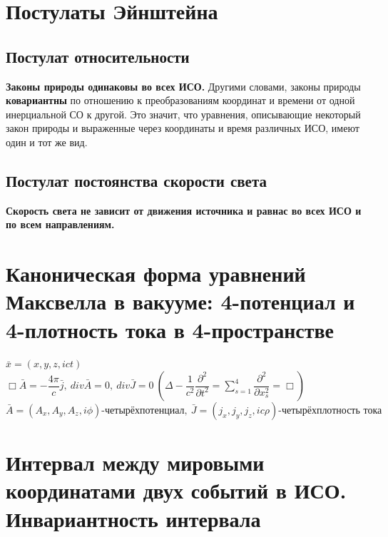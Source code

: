 \newcommand{\colontitulAutors}{edombek, astronom\_v\_cube}
\newcommand{\colontitulYear}{2022}
\newcommand{\colontitulEducationalSubject}{Специальная теория относительности}
\newcommand{\colontitulTeacher}{И.~А.~Павличенко}




	\small
	\begin{multicols*}{2}
		\section{Постулаты Эйнштейна}
		
		\subsection{Постулат относительности}
		
		\textbf{Законы природы одинаковы во всех ИСО.} Другими словами, законы природы \textbf{ковариантны} по отношению к преобразованиям координат и времени от одной инерциальной СО к другой. Это значит, что уравнения, описывающие некоторый закон природы и выраженные через координаты и время различных ИСО, имеют один и тот же вид.
		
		\subsection{Постулат постоянства скорости света}
		
		\textbf{Скорость света не зависит от движения источника и равнас во всех ИСО и по всем направлениям.}
		
		\section{Каноническая форма уравнений Максвелла в вакууме: 4-потенциал и 4-плотность тока в 4-пространстве}
		
		$ \bar{x} = \left(x, y, z, ict\right) $ \\
		$ \Box \bar{A} = -\dfrac{4\pi}{c}\bar{j},~ div{\bar{A}} = 0,~ div{\bar{J}} = 0~ \left(\Delta -\dfrac{1}{c^2}\dfrac{\partial^2}{\partial t^2}=\sum\limits_{s=1}^4\dfrac{\partial^2}{\partial x_s^2}=\Box\right) $  \\
		$ \bar{A} = \left(A_x, A_y, A_z, i\phi\right) \text{-четырёхпотенциал},~ \bar{J} = \left(j_x, j_y, j_z, ic\rho\right) \text{-четырёхплотность тока} $
		
		\section{Интервал между мировыми координатами двух событий в ИСО. Инвариантность интервала}
		

\end{multicols*}
